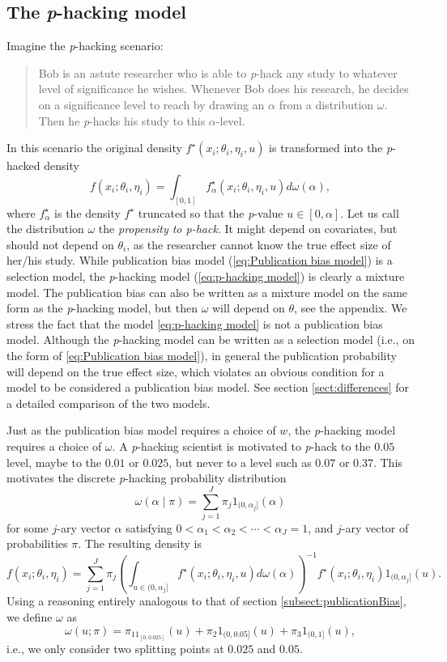 \documentclass{article}
\theoremstyle{plain}
\theoremstyle{definition}
\begin{document}
\subsection{The \textit{p}-hacking model}\label{subsect:p-hacking}
Imagine the \textit{p}-hacking scenario:
\begin{quote}
Bob is an astute researcher who is able to \textit{p}-hack any study to whatever level of significance he wishes. Whenever Bob does his research, he decides on a significance level to reach by drawing an $\alpha$ from a distribution $\omega$. Then he \textit{p}-hacks his study to this $\alpha$-level.
\end{quote}
In this scenario the original density $f^{\star}(x_{i};\theta_{i},\eta_{i}, u)$
is transformed into the \textit{p}-hacked density
\begin{equation}\label{eq:p-hacking model}
f(x_{i};\theta_{i},\eta_{i})=\int_{[0,1]}f_\alpha^{\star}(x_{i};\theta_{i},\eta_{i}, u)d\omega(\alpha),
\end{equation}
where $f_\alpha^{\star}$ is the density $f^{\star}$ truncated so that the \textit{p}-value $u\in\left[0,\alpha\right]$. Let us call the distribution $\omega$ the \emph{propensity to p-hack}. It might depend on covariates, but should not depend on $\theta_{i}$, as the researcher cannot know the true effect size of her/his study. While publication bias model (\ref{eq:Publication bias model}) is a selection model, the \textit{p}-hacking model (\ref{eq:p-hacking model}) is clearly a mixture model. The publication bias can also be written as a mixture model on the same form as the \textit{p}-hacking model, but then $\omega$ will depend on $\theta$, see the appendix. We stress the fact that the model \eqref{eq:p-hacking model} is not a publication bias model. Although the \textit{p}-hacking model can be written as a selection model (i.e., on the form of \eqref{eq:Publication bias model}), in general the publication probability will depend on the true effect size, which violates an obvious condition for a model to be considered a publication bias model. See section \ref{sect:differences} for a detailed comparison of the two models.

Just as the publication bias model requires a choice of $w$, the \textit{p}-hacking model requires a choice of $\omega$. A \textit{p}-hacking scientist is motivated to \textit{p}-hack to the $0.05$ level, maybe to the $0.01$ or $0.025$, but never to a level such as $0.07$ or $0.37$. This motivates the discrete \textit{p}-hacking probability distribution
$$\omega(\alpha\mid\pi)=\sum_{j=1}^{J}\pi_{j}1_{(0,\alpha_{j}]}(\alpha)$$
for some $j$-ary vector $\alpha$ satisfying $0<\alpha_{1}<\alpha_{2}<\cdots<\alpha_{J}=1$,
and $j$-ary vector of probabilities $\pi$. The resulting density is 
\[
f(x_{i};\theta_{i},\eta_{i})=\sum_{j=1}^{J}\pi_{j}\left(\int_{u\in(0,\alpha_{j}]}f^\star(x_{i};\theta_{i},\eta_{i}, u)d\omega(\alpha)\right)^{-1}f^\star(x_{i};\theta_{i},\eta_{i})1_{(0,\alpha_{j}]}(u).
\]
Using a reasoning entirely analogous to that of section \ref{subsect:publicationBias}, we define $\omega$ as
\[
\omega(u;\pi) = \pi_11_{[0,0.025]}(u) + \pi_{2}1_{(0,0.05]}(u) + \pi_{3}1_{(0,1]}(u),
\]
i.e., we only consider two splitting points at $0.025$ and $0.05$.
\end{document}
